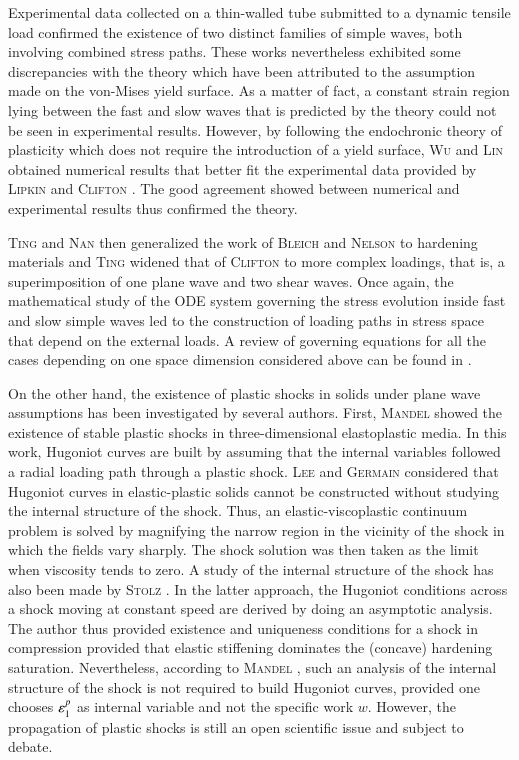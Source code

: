 Experimental data collected on a thin-walled tube submitted to a dynamic tensile load \cite{Clifton_exp,Clifton_exp2} confirmed the existence of two distinct families of  simple waves, both involving combined stress paths.
These works nevertheless exhibited some discrepancies with the theory which have been attributed to the assumption made on the von-Mises yield surface.
As a matter of fact, a constant strain region lying between the fast and slow waves that is predicted by the theory \cite{Clifton} could not be seen in experimental results.
However, by following the endochronic theory of plasticity \cite{Valanis} which does not require the introduction of a yield surface, \textsc{Wu} and \textsc{Lin} \cite{Wu_experimental} obtained numerical results that better fit the experimental data provided by \textsc{Lipkin} and \textsc{Clifton} \cite{Clifton_exp2}.
The good agreement showed between numerical and experimental results \cite{Wu_experimental} thus confirmed the theory.

\textsc{Ting} and \textsc{Nan} \cite{Ting68} then generalized the work of \textsc{Bleich} and \textsc{Nelson} to hardening materials and \textsc{Ting} \cite{Ting69} widened that of \textsc{Clifton} to more complex loadings, that is, a superimposition of one plane wave and two shear waves.
Once again, the mathematical study of the ODE system governing the stress evolution inside fast and slow simple waves led to the construction of loading paths in stress space that depend on the external loads. A review of governing equations for all the cases depending on one space dimension considered above can be found in \cite{Nowacki}.


On the other hand, the existence of plastic shocks in solids under plane wave assumptions has been investigated by several authors. 
First, \textsc{Mandel} \cite{Mandel1} showed the existence of stable plastic shocks in three-dimensional elastoplastic media.
In this work, Hugoniot curves are built by assuming that the internal variables followed a radial loading path through a plastic shock.
\textsc{Lee} and \textsc{Germain} \cite{Germain_shock} considered that Hugoniot curves in elastic-plastic solids cannot be constructed without studying the internal structure of the shock.
Thus, an elastic-viscoplastic continuum problem is solved by magnifying the narrow region in the vicinity of the shock in which the fields vary sharply.
The shock solution was then taken as the limit when viscosity tends to zero.
A study of the internal structure of the shock has also been made by \textsc{Stolz} \cite{Claude}.
In the latter approach, the Hugoniot conditions across a shock moving at constant speed are derived by doing an asymptotic analysis. 
The author thus provided existence and uniqueness conditions for a shock in compression provided that elastic stiffening dominates the (concave) hardening saturation.
Nevertheless, according to \textsc{Mandel} \cite{Mandel2}, such an analysis of the internal structure of the shock is not required to build Hugoniot curves, provided one chooses $\varepsilon^p_1$ as internal variable and not the specific work $w$.
However, the propagation of plastic shocks is still an open scientific issue and subject to debate.

